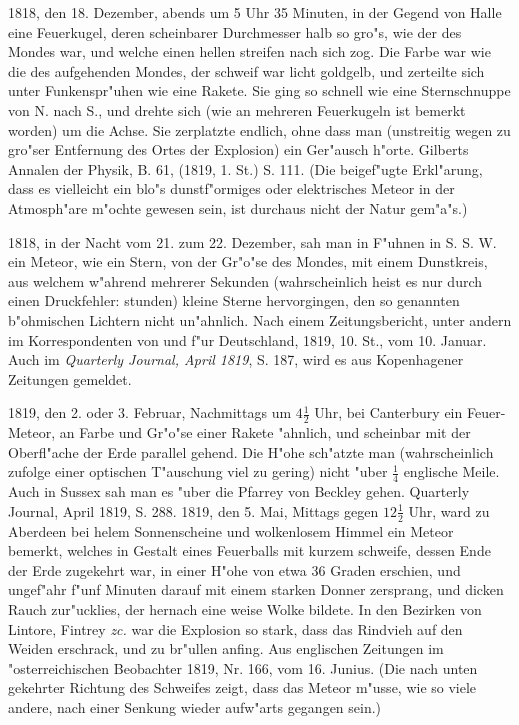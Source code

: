 \documentclass[a4paper, 11pt, oneside, polutonikogreek, german]{article}
\begin{document}
1818, den 18. Dezember, abends um 5 Uhr 35 Minuten, in der Gegend von Halle eine Feuerkugel, deren scheinbarer Durchmesser halb so gro"s, wie der des Mondes war, und welche einen hellen streifen nach sich zog. Die Farbe war wie die des aufgehenden Mondes, der schweif war licht goldgelb, und zerteilte sich unter Funkenspr"uhen wie eine Rakete. Sie ging so schnell wie eine Sternschnuppe von N. nach S., und drehte sich (wie an mehreren Feuerkugeln ist bemerkt worden) um die Achse. Sie zerplatzte endlich, ohne dass man (unstreitig wegen zu gro"ser Entfernung des Ortes der Explosion) ein Ger"ausch h"orte. Gilberts Annalen der Physik, B. 61, (1819, 1. St.) S. 111. (Die beigef"ugte Erkl"arung, dass es vielleicht ein blo"s dunstf"ormiges oder elektrisches Meteor in der Atmosph"are m"ochte gewesen sein, ist durchaus nicht der Natur gem"a"s.)

1818, in der Nacht vom 21. zum 22. Dezember, sah man in F"uhnen in S. S. W. ein Meteor, wie ein Stern, von der Gr"o"se des Mondes, mit einem Dunstkreis, aus welchem w"ahrend mehrerer Sekunden (wahrscheinlich heist es nur durch einen Druckfehler: stunden) kleine Sterne hervorgingen, den so genannten b"ohmischen Lichtern nicht un"ahnlich. Nach einem Zeitungsbericht, unter andern im Korrespondenten von und f"ur Deutschland, 1819, 10. St., vom 10. Januar. Auch im \emph{Quarterly Journal, April 1819}, S. 187, wird es aus Kopenhagener Zeitungen gemeldet.

1819, den 2. oder 3. Februar, Nachmittags um $\mathfrak{4\frac{1}{2}}$ Uhr, bei Canterbury ein Feuer-Meteor, an Farbe und Gr"o"se einer Rakete "ahnlich, und scheinbar mit der Oberfl"ache der Erde parallel gehend. Die H"ohe sch"atzte man (wahrscheinlich zufolge einer optischen T"auschung viel zu gering) nicht "uber $\mathfrak{\frac{1}{4}}$ englische Meile. Auch in Sussex sah man es "uber die Pfarrey von Beckley gehen. Quarterly Journal, April 1819, S. 288. 1819, den 5. Mai, Mittags gegen $\mathfrak{12\frac{1}{2}}$ Uhr, ward zu Aberdeen bei helem Sonnenscheine und wolkenlosem Himmel ein Meteor bemerkt, welches in Gestalt eines Feuerballs mit kurzem schweife, dessen Ende der Erde zugekehrt war, in einer H"ohe von etwa 36 Graden erschien, und ungef"ahr f"unf Minuten darauf mit einem starken Donner zersprang, und dicken Rauch zur"ucklies, der hernach eine weise Wolke bildete. In den Bezirken von Lintore, Fintrey \emph{zc.} war die Explosion so stark, dass das Rindvieh auf den Weiden erschrack, und zu br"ullen anfing. Aus englischen Zeitungen im "osterreichischen Beobachter 1819, Nr. 166, vom 16. Junius. (Die nach unten gekehrter Richtung des Schweifes zeigt, dass das Meteor m"usse, wie so viele andere, nach einer Senkung wieder aufw"arts gegangen sein.)
\end{document}
